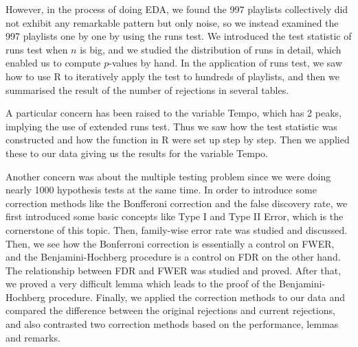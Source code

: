 \documentclass[12pt]{article}
\theoremstyle{plain}
\theoremstyle{definition}
\theoremstyle{remark}
\begin{document}
However, in the process of doing EDA, we found the 997 playlists collectively did not exhibit any remarkable pattern but only noise, so we instead examined the 997 playlists one by one by using the runs test. We introduced the test statistic of runs test when $n$ is big, and we studied the distribution of runs in detail, which enabled us to compute $p$-values by hand. In the application of runs test, we saw how to use R to iteratively apply the test to hundreds of playlists, and then we summarised the result of the number of rejections in several tables. 

A particular concern has been raised to the variable Tempo, which has 2 peaks, implying the use of extended runs test. Thus we saw how the test statistic was constructed and how the function in R were set up step by step. Then we applied these to our data giving us the results for the variable Tempo.

Another concern was about the multiple testing problem since we were doing nearly 1000 hypothesis tests at the same time. In order to introduce some correction methods like the Bonfferoni correction and the false discovery rate, we first introduced some basic concepts like Type I and Type II Error, which is the cornerstone of this topic. Then, family-wise error rate was studied and discussed. Then, we see how the Bonferroni correction is essentially a control on FWER, and the Benjamini-Hochberg procedure is a control on FDR on the other hand. The relationship between FDR and FWER was studied and proved. After that, we proved a very difficult lemma which leads to the proof of the Benjamini-Hochberg procedure. Finally, we applied the correction methods to our data and compared the difference between the original rejections and current rejections, and also contrasted two correction methods based on the performance, lemmas and remarks.
\end{document}
